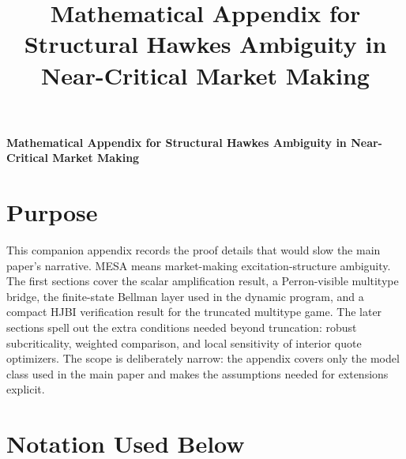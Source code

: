\documentclass[11pt]{article}
\title{Mathematical Appendix for Structural Hawkes Ambiguity in Near-Critical Market Making}
\author{}
\date{}
\begin{document}
\begin{center}
{\LARGE\bfseries Mathematical Appendix for Structural Hawkes Ambiguity in Near-Critical Market Making\par}
\end{center}
\vspace{0.75em}

\section{Purpose}

This companion appendix records the proof details that would slow the main
paper's narrative. MESA means market-making excitation-structure ambiguity. The
first sections cover the scalar amplification result, a Perron-visible multitype
bridge, the finite-state Bellman layer used in the dynamic program, and a
compact HJBI verification result for the truncated multitype game. The later
sections spell out the extra conditions needed beyond truncation: robust
subcriticality, weighted comparison, and local sensitivity of interior quote
optimizers. The scope is deliberately narrow: the appendix covers only the
model class used in the main paper and makes the assumptions needed for
extensions explicit.

\section{Notation Used Below}
\end{document}
